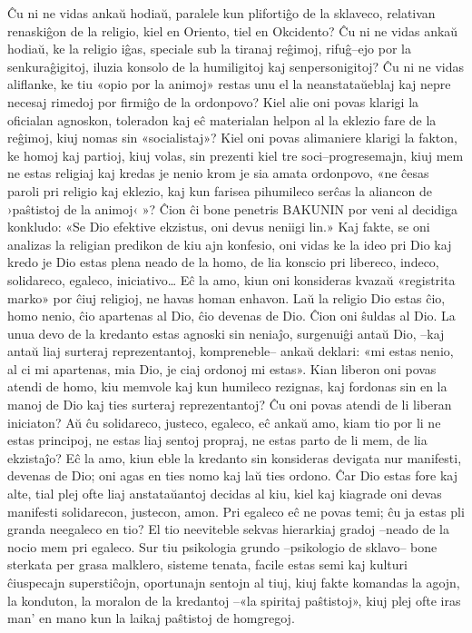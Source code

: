 Ĉu ni ne vidas ankaŭ hodiaŭ, paralele kun plifortiĝo de la sklaveco, relativan renaskiĝon de la religio, kiel en Oriento, tiel en Okcidento? Ĉu ni ne vidas ankaŭ hodiaŭ, ke la religio iĝas, speciale sub la tiranaj reĝimoj, rifuĝ–ejo por la senkuraĝigitoj, iluzia konsolo de la humiligitoj kaj senpersonigitoj? Ĉu ni ne vidas aliflanke, ke tiu «opio por la animoj» restas unu el la neanstataŭeblaj kaj nepre necesaj rimedoj por firmiĝo de la ordonpovo? Kiel alie oni povas klarigi la oficialan agnoskon, toleradon kaj eĉ materialan helpon al la eklezio fare de la reĝimoj, kiuj nomas sin «socialistaj»? Kiel oni povas alimaniere klarigi la fakton, ke homoj kaj partioj, kiuj volas, sin prezenti kiel tre soci–progresemajn, kiuj mem ne estas religiaj kaj kredas je nenio krom je sia amata ordonpovo, «ne ĉesas paroli pri religio kaj eklezio, kaj kun farisea pihumileco serĉas la aliancon de ›paŝtistoj de la animoj‹ »? Ĉion ĉi bone penetris BAKUNIN por veni al decidiga konkludo: «Se Dio efektive ekzistus, oni devus neniigi lin.» Kaj fakte, se oni analizas la religian predikon de kiu ajn konfesio, oni vidas ke la ideo pri Dio kaj kredo je Dio estas plena neado de la homo, de lia konscio pri libereco, indeco, solidareco, egaleco, iniciativo… Eĉ la amo, kiun oni konsideras kvazaŭ «registrita marko» por ĉiuj religioj, ne havas homan enhavon. Laŭ la religio Dio estas ĉio, homo nenio, ĉio apartenas al Dio, ĉio devenas de Dio. Ĉion oni ŝuldas al Dio. La unua devo de la kredanto estas agnoski sin neniaĵo, surgenuiĝi antaŭ Dio, –kaj antaŭ liaj surteraj reprezentantoj, kompreneble– ankaŭ deklari: «mi estas nenio, al ci mi apartenas, mia Dio, je ciaj ordonoj mi estas». Kian liberon oni povas atendi de homo, kiu memvole kaj kun humileco rezignas, kaj fordonas sin en la manoj de Dio kaj ties surteraj reprezentantoj? Ĉu oni povas atendi de li liberan iniciaton? Aŭ ĉu solidareco, justeco, egaleco, eĉ ankaŭ amo, kiam tio por li ne estas principoj, ne estas liaj sentoj propraj, ne estas parto de li mem, de lia ekzistaĵo? Eĉ la amo, kiun eble la kredanto sin konsideras devigata nur manifesti, devenas de Dio; oni agas en ties nomo kaj laŭ ties ordono. Ĉar Dio estas fore kaj alte, tial plej ofte liaj anstataŭantoj decidas al kiu, kiel kaj kiagrade oni devas manifesti solidarecon, justecon, amon. Pri egaleco eĉ ne povas temi; ĉu ja estas pli granda neegaleco en tio? El tio neeviteble sekvas hierarkiaj gradoj –neado de la nocio mem pri egaleco. Sur tiu psikologia grundo –psikologio de sklavo– bone sterkata per grasa malklero, sisteme tenata, facile estas semi kaj kulturi ĉiuspecajn superstiĉojn, oportunajn sentojn al tiuj, kiuj fakte komandas la agojn, la konduton, la moralon de la kredantoj –«la spiritaj paŝtistoj», kiuj plej ofte iras man’ en mano kun la laikaj paŝtistoj de homgregoj.

